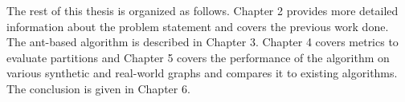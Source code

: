 \begin{spacing}{1.5}
\indent The rest of this thesis is organized as follows. Chapter 2 provides more detailed information about the problem statement and covers the previous work done. The ant-based algorithm is described in Chapter 3. Chapter 4 covers metrics to evaluate partitions and Chapter 5 covers the performance of the algorithm on various synthetic and real-world graphs and compares it to existing algorithms. The conclusion is given in Chapter 6.
\end{spacing}